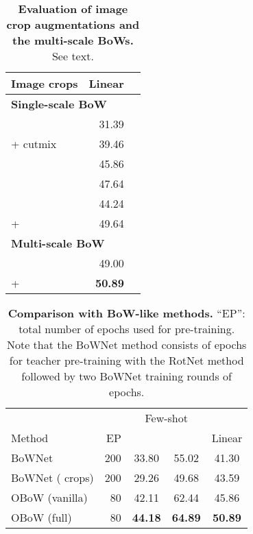 \documentclass[final]{cvpr}
\begin{document}
\begin{table}[t!]
\centering
\renewcommand{\figurename}{Table}
\renewcommand{\captionlabelfont}{\bf}
\renewcommand{\captionfont}{\small} 
{\setlength{\extrarowheight}{2pt}\small
{
\begin{tabular}{ l | r | c  }
\toprule
\multicolumn{1}{l|}{Image crops} & \multicolumn{1}{c}{Linear}\\
\midrule
\multicolumn{2}{l}{\textbf{Single-scale BoW}} \\
\;                        & 31.39\\
\; + cutmix               & 39.46\\
\;                        & 45.86\\
\;                        & 47.64\\
\;                          & 44.24\\
\; +        & 49.64\\
\midrule
\multicolumn{2}{l}{\textbf{Multi-scale BoW}} \\
\;                        & 49.00\\
\; +        & \textbf{50.89}\\
\bottomrule
\end{tabular}}}
\vspace{-8pt}
\caption{
\textbf{Evaluation of image crop augmentations and the multi-scale BoWs.} See text. 
}
\vspace{-12pt}
\label{tab:results_aug_multibow}
\end{table}

\begin{table}[t!]
\centering
\renewcommand{\figurename}{Table}
\renewcommand{\captionlabelfont}{\bf}
\renewcommand{\captionfont}{\small} 
{\setlength{\extrarowheight}{2pt}\small
{
\begin{tabular}{ l  | r | c   c  | c  }
\toprule
& & \multicolumn{2}{c|}{Few-shot} & \multicolumn{1}{l}{}\\
\multicolumn{1}{l|}{Method} & EP & \multicolumn{1}{c}{} & \multicolumn{1}{c|}{} & \multicolumn{1}{l}{Linear}\\
\midrule
\;BoWNet                                  & 200 & 33.80 & 55.02 & 41.30\\
\;BoWNet ( crops)                  & 200 & 29.26 & 49.68 & 43.59\\
\midrule
\;OBoW (vanilla)     &  80 & 42.11 & 62.44 & 45.86\\
\;OBoW (full)        &  80 & \textbf{44.18} & \textbf{64.89} & \textbf{50.89}\\
\bottomrule
\end{tabular}}}
\vspace{-8pt}
\caption{
\textbf{Comparison with BoW-like methods.}
``EP'': total number of epochs used for pre-training.
Note that the BoWNet method consists of  epochs for teacher pre-training with the RotNet method followed by two BoWNet training rounds of  epochs.
}
\vspace{-8pt}
\label{tab:comparison_sota}
\end{table}
\end{document}
